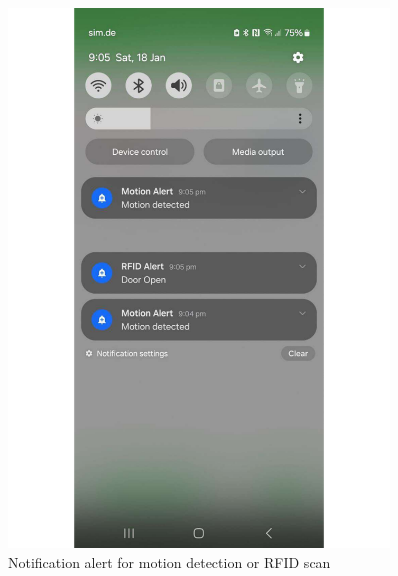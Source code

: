 \documentclass[a4paper]{scrartcl}
\begin{document}
\begin{figure}[h]
\begin{minipage}{0.45\textwidth}
        \includegraphics[width=0.9\textwidth]{notification.pdf}
        \caption{Notification alert for motion detection or RFID scan}
        \label{fig:notification}
    \end{minipage}
    
    \vspace{0.7cm} %
\end{figure}
\end{document}

